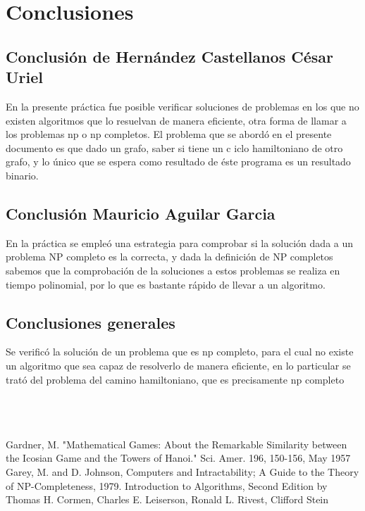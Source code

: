 \documentclass[12pt,twoside]{article}
\begin{document}
\section{Conclusiones}
\subsection{Conclusión de Hernández Castellanos César Uriel}
En la presente práctica fue posible verificar soluciones de problemas en los que no existen algoritmos que lo resuelvan de manera eficiente, otra forma de llamar a los problemas np o np completos. El problema que se abordó en el presente documento es que dado un grafo, saber si tiene un c iclo hamiltoniano de otro grafo, y lo único que se espera como resultado de éste programa es un resultado binario.
\subsection{Conclusión Mauricio Aguilar Garcia }
    En la práctica se empleó una estrategia para comprobar si la solución dada a un problema NP completo es la correcta, y dada la definición de NP completos sabemos que la comprobación de la soluciones a estos problemas se realiza en tiempo polinomial, por lo que es bastante rápido de llevar a un algoritmo.
\subsection{Conclusiones generales}
Se verificó la solución de un problema que es np completo, para el cual no existe un algoritmo que sea capaz de resolverlo de manera eficiente, en lo particular se trató del problema del camino hamiltoniano, que es precisamente np completo
\\
\\
\\
\\
\begin{thebibliography}{9}
 Gardner, M. "Mathematical Games: About the Remarkable Similarity between the Icosian Game and the Towers of Hanoi." Sci. Amer. 196, 150-156, May 1957
 Garey, M. and D. Johnson, Computers and Intractability; A Guide to the Theory of NP-Completeness, 1979.
 Introduction to Algorithms, Second Edition by Thomas H. Cormen, Charles E. Leiserson, Ronald L. Rivest, Clifford Stein
  
\end{thebibliography}
\end{document}
